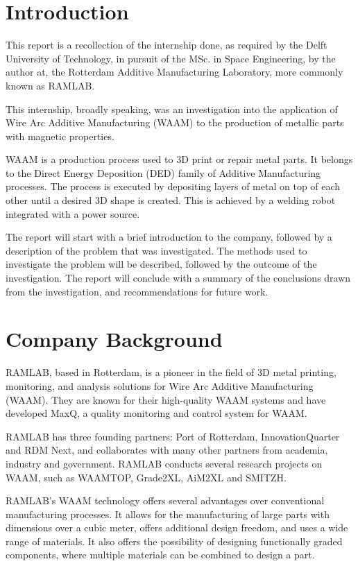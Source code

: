 \section*{Introduction}

This report is a recollection of the internship done, as required by the
Delft University of Technology, in pursuit of the MSc. in Space Engineering,
by the author at, the Rotterdam
Additive Manufacturing Laboratory, more commonly known as RAMLAB.

This internship, broadly speaking, was an investigation into the
application of Wire Arc Additive Manufacturing (WAAM) to the production of
metallic parts with magnetic properties.

WAAM is a production process used to 3D print or repair metal parts. It belongs to the Direct Energy Deposition (DED) family of Additive Manufacturing processes. The process is executed by depositing layers of metal on top of each other until a desired 3D shape is created. This is achieved by a welding robot integrated with a power source.

The report will start with a brief introduction to the company, followed by
a description of the problem that was investigated. The methods used to
investigate the problem will be described, followed by the outcome of the
investigation. The report will conclude with a summary of the conclusions
drawn from the investigation, and recommendations for future work.

\section{Company Background}

RAMLAB, based in Rotterdam, is a pioneer in the field of 3D metal printing, monitoring, and analysis solutions for Wire Arc Additive Manufacturing (WAAM). They are known for their high-quality WAAM systems and have developed MaxQ, a quality monitoring and control system for WAAM.

RAMLAB has three founding partners: Port of Rotterdam, InnovationQuarter and RDM Next, and collaborates with many other partners from academia, industry and government. RAMLAB conducts several research projects on WAAM, such as WAAMTOP, Grade2XL, AiM2XL and SMITZH.

RAMLAB's WAAM technology offers several advantages over conventional manufacturing processes. It allows for the manufacturing of large parts with dimensions over a cubic meter, offers additional design freedom, and uses a wide range of materials. It also offers the possibility of designing functionally graded components, where multiple materials can be combined to design a part.

